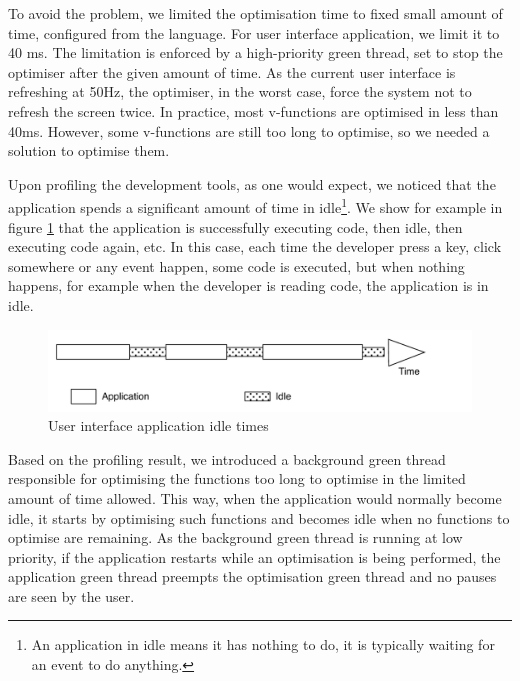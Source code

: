 \documentclass[a4paper,12pt,twoside]{../includes/ThesisStyle}
\begin{document}
To avoid the problem, we limited the optimisation time to fixed small amount of time, configured from the language. For user interface application, we limit it to 40 ms. The limitation is enforced by a high-priority green thread, set to stop the optimiser after the given amount of time. As the current user interface is refreshing at 50Hz, the optimiser, in the worst case, force the system not to refresh the screen twice. In practice, most v-functions are optimised in less than 40ms. However, some v-functions are still too long to optimise, so we needed a solution to optimise them.

Upon profiling the development tools, as one would expect, we noticed that the application spends a significant amount of time in idle\footnote{An application in idle means it has nothing to do, it is typically waiting for an event to do anything.}. We show for example in figure \ref{fig:ApplicationIdle} that the application is successfully executing code, then idle, then executing code again, etc. In this case, each time the developer press a key, click somewhere or any event happen, some code is executed, but when nothing happens, for example when the developer is reading code, the application is in idle.

\begin{figure}[h!]
    \begin{center}
        \includegraphics[width=0.95\linewidth]{ApplicationIdle}
        \caption{User interface application idle times}
        \label{fig:ApplicationIdle}
    \end{center}
\end{figure}

Based on the profiling result, we introduced a background green thread responsible for optimising the functions too long to optimise in the limited amount of time allowed. This way, when the application would normally become idle, it starts by optimising such functions and becomes idle when no functions to optimise are remaining. As the background green thread is running at low priority, if the application restarts while an optimisation is being performed, the application green thread preempts the optimisation green thread and no pauses are seen by the user.
\end{document}
